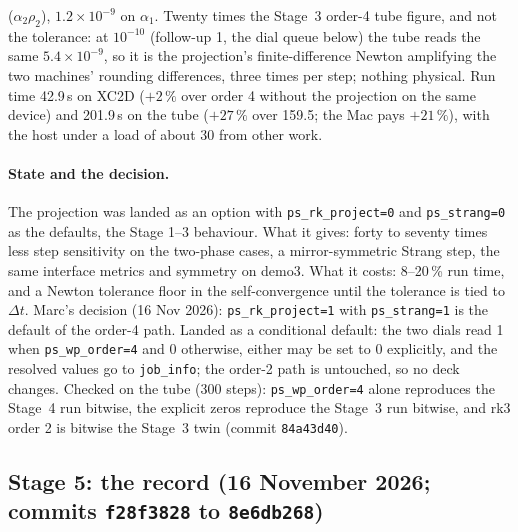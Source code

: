 \documentclass[11pt,a4paper]{article}
\newcommand{\code}[1]{\texttt{\small #1}}
\newcommand{\Dt}{\Delta t}
\begin{document}
\begin{enumerate}[nosep]
      ($\alpha_2\rho_2$), $1.2\times10^{-9}$ on $\alpha_1$.  Twenty
      times the Stage~3 order-4 tube figure, and not the tolerance: at
      $10^{-10}$ (follow-up 1, the dial queue below) the tube reads the
      same $5.4\times10^{-9}$, so it is the projection's
      finite-difference Newton amplifying the two machines' rounding
      differences, three times per step; nothing physical.  Run time 42.9\,s on XC2D ($+2\,\%$ over order 4 without
      the projection on the same device) and 201.9\,s on the tube
      ($+27\,\%$ over 159.5; the Mac pays $+21\,\%$), with the host
      under a load of about 30 from other work.
\end{enumerate}

\paragraph{State and the decision.}  The projection was landed as an
option with \code{ps\_rk\_project=0} and \code{ps\_strang=0} as the
defaults, the Stage 1--3 behaviour.  What it gives: forty to seventy
times less step sensitivity on the two-phase cases, a mirror-symmetric
Strang step, the same interface metrics and symmetry on demo3.  What it
costs: 8--20\,\% run time, and a Newton tolerance floor in the
self-convergence until the tolerance is tied to $\Dt$.  Marc's decision
(16 Nov 2026): \code{ps\_rk\_project=1} with \code{ps\_strang=1} is
the default of the order-4 path.  Landed as a conditional default: the
two dials read 1 when \code{ps\_wp\_order=4} and 0 otherwise, either
may be set to 0 explicitly, and the resolved values go to
\code{job\_info}; the order-2 path is untouched, so no deck changes.
Checked on the tube (300 steps): \code{ps\_wp\_order=4} alone
reproduces the Stage~4 run bitwise, the explicit zeros reproduce the
Stage~3 run bitwise, and rk3 order 2 is bitwise the Stage~3 twin
(commit \code{84a43d40}).

\subsection{Stage 5: the record (16 November 2026; commits \code{f28f3828} to \code{8e6db268})}
\label{sec:stage5}
\end{document}
